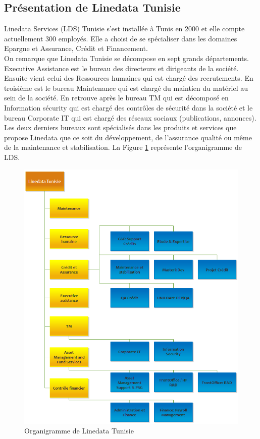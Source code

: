 \subsection{Présentation de Linedata Tunisie}
Linedata Services (LDS) Tunisie s'est installée à Tunis en 2000 et elle compte actuellement 300 employés. Elle a choisi de se spécialiser dans les domaines Epargne et Assurance, Crédit et Financement.\\

On remarque que Linedata Tunisie se décompose en sept grands départements. Executive Assistance est le bureau des directeurs et dirigeants de la société. Ensuite vient celui des Ressources humaines qui est chargé des recrutements. En troisième est le bureau Maintenance qui est chargé du maintien du matériel au sein de la société. En retrouve après le bureau TM qui est décomposé en Information sécurity qui est chargé des contrôles de sécurité dans la société et le bureau Corporate IT qui est chargé des réseaux sociaux (publications, annonces). Les deux derniers bureaux sont spécialisés dans les produits et services que propose Linedata que ce soit du développement, de l'assurance qualité ou même de la maintenance et stabilisation. La Figure \ref{code2} représente l'organigramme de LDS.


\begin{figure}[H]
  \centering
  \includegraphics[scale = 1.0]{figures/Organigramme_Linedata_2.png}
  \caption{Organigramme de Linedata Tunisie}
  \label{code2}
\end{figure}


